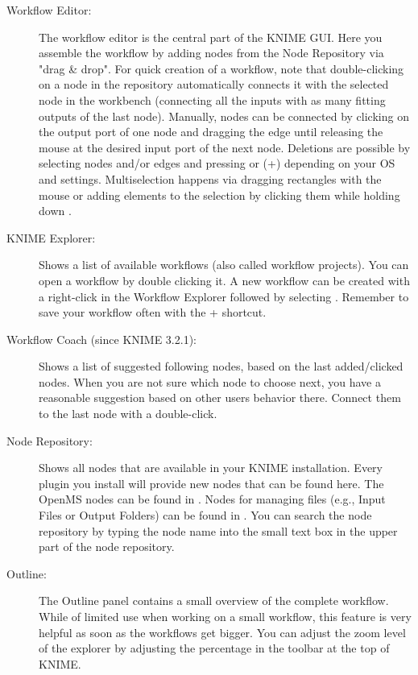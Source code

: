 \begin{description}
\item[Workflow Editor:]
The workflow editor is the central part of the KNIME GUI.
Here you assemble the workflow by adding nodes from the Node Repository via "drag \& drop". For quick creation of a 
workflow, note that double-clicking on 
a node in the repository automatically connects it with the selected node in the workbench (connecting all the inputs 
with as many fitting outputs of the last node).
Manually, nodes can be connected by clicking on the output port of one node and dragging the edge until releasing the 
mouse at the desired input port of the next node. Deletions are possible by selecting nodes and/or edges and pressing 
 or (+) depending on your OS and settings. Multiselection happens via dragging 
rectangles with the mouse or adding elements to the selection by clicking them while holding down .

\item[KNIME Explorer:]
Shows a list of available workflows (also called workflow projects).
You can open a workflow by double clicking it.
A new workflow can be created with a right-click in the Workflow Explorer followed by selecting .
Remember to save your workflow often with the + shortcut.

\item[Workflow Coach (since KNIME 3.2.1):]
Shows a list of suggested following nodes, based on the last added/clicked nodes.
When you are not sure which node to choose next, you have a reasonable suggestion based on other users behavior 
there. Connect them to the last node with a double-click.

\item[Node Repository:]
Shows all nodes that are available in your KNIME installation.
Every plugin you install will provide new nodes that can be found here.
The OpenMS nodes can be found in .
Nodes for managing files (e.g., Input Files or Output Folders) can be found in .
You can search the node repository by typing the node name into the small text box in the upper part of the node repository.

\item[Outline:]
The Outline panel contains a small overview of the complete workflow. While of limited use when working on a small 
workflow, this feature is very helpful as soon as the workflows get bigger. You can adjust the zoom level of the 
explorer by adjusting the percentage in the toolbar at the top of KNIME.


\end{description}
